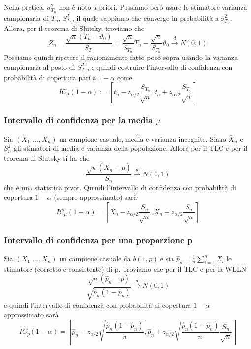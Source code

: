 Nella pratica, $\sigma^2_{T_n}$ non è noto a priori. Possiamo però usare lo stimatore varianza campionaria di $T_n$, $S^2_{T_n}$, il quale sappiamo che converge in probabilità a $\sigma^2_{T_n}$. Allora, per il teorema di Slutsky, troviamo che 
$$Z_n=\frac{\sqrt{n}(T_n - \vartheta_0)}{S_{T_n}} = \frac{\sqrt{n}}{S_{T_n}} T_n - \frac{\sqrt{n}}{S_{T_n}} \vartheta_0 \stackrel{d}{\rightarrow}N(0,1)$$ Possiamo quindi ripetere il ragionamento fatto poco sopra usando la varianza campionaria al posto di $S^2_{T_n}$, e quindi costruire l'intervallo di confidenza con probabilità di copertura pari a $1 - \alpha$ come $$IC_\vartheta (1-\alpha) := \left[t_n - z_{\alpha / 2} \frac{S_{T_n}}{\sqrt{n}}, t_n + z_{\alpha / 2} \frac{S_{T_n}}{\sqrt{n}}\right]$$
\subsubsection{Intervallo di confidenza per la media $\mu$}
Sia $(X_1,...,X_n)$ un campione casuale, media e varianza incognite. Siano $\bar{X}_n$ e $S^2_n$ gli stimatori di media e varianza della popolazione. Allora per il TLC e per il teorema di Slutsky si ha che 
$$\frac{\sqrt{n}(\bar{X}_n - \mu)}{S_n} \stackrel{d}{\rightarrow}N(0,1)$$
che è una statistica pivot. Quindi l'intervallo di confidenza con probabilità di copertura $1-\alpha$ (sempre approssimato) sarà
$$IC_\mu(1-\alpha)=\left[\bar{X}_n - z_{\alpha / 2} \frac{S_n}{\sqrt{n}}, \bar{X}_n + z_{\alpha / 2} \frac{S_n}{\sqrt{n}}\right]$$
\subsubsection{Intervallo di confidenza per una proporzione p}
Sia $(X_1,...,X_n)$ un campione casuale da $b(1,p)$ e sia $\hat{p}_n=\frac{1}{n} \sum_{i=1}^n X_i$ lo stimatore (corretto e consistente) di p. Troviamo che per il TLC e per la WLLN $$\frac{\sqrt{n}(\hat{p}_n - p)}{\sqrt{\hat{p}_n(1-\hat{p}_n)}} \stackrel{d}{\rightarrow}N(0,1)$$
e quindi l'intervallo di confidenza con probabilità di copertura $1-\alpha$ approssimato sarà
$$IC_p(1-\alpha)=
\left[\hat{p}_n -
 z_{\alpha / 2} 
 \sqrt{\frac{\hat{p}_n(1-\hat{p}_n)}{n}},
  \hat{p}_n + z_{\alpha / 2}\sqrt{\frac{\hat{p}_n(1-\hat{p}_n)}{n}} \frac{S_n}{\sqrt{n}}\right]$$